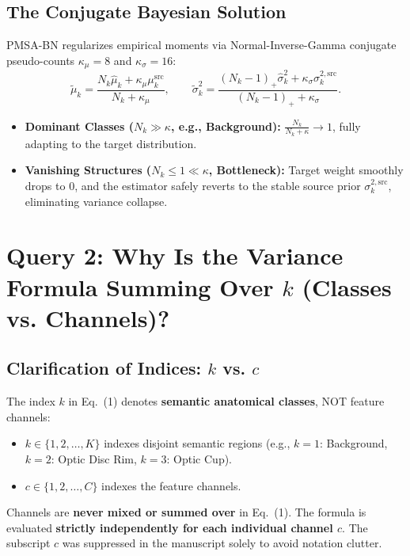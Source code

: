 \documentclass[11pt,a4paper]{article}
\begin{document}
\subsection{The Conjugate Bayesian Solution}
PMSA-BN regularizes empirical moments via Normal-Inverse-Gamma conjugate pseudo-counts $\kappa_\mu = 8$ and $\kappa_\sigma = 16$:
\begin{equation}
    \tilde{\mu}_k = \frac{N_k \hat{\mu}_k + \kappa_\mu \mu_k^{\mathrm{src}}}{N_k + \kappa_\mu}, \qquad 
    \tilde{\sigma}^2_k = \frac{(N_k - 1)_+ \hat{\sigma}^2_k + \kappa_\sigma \sigma_k^{2,\mathrm{src}}}{(N_k - 1)_+ + \kappa_\sigma}.
\end{equation}
\begin{itemize}
    \item \textbf{Dominant Classes ($N_k \gg \kappa$, e.g., Background):} $\frac{N_k}{N_k + \kappa} \to 1$, fully adapting to the target distribution.
    \item \textbf{Vanishing Structures ($N_k \le 1 \ll \kappa$, Bottleneck):} Target weight smoothly drops to $0$, and the estimator safely reverts to the stable source prior $\sigma_k^{2,\mathrm{src}}$, eliminating variance collapse.
\end{itemize}

\vspace{2em}

\section{Query 2: Why Is the Variance Formula Summing Over $k$ (Classes vs. Channels)?}

\subsection{Clarification of Indices: $k$ vs. $c$}
The index $k$ in Eq.~(1) denotes \textbf{semantic anatomical classes}, NOT feature channels:
\begin{itemize}
    \item $k \in \{1, 2, \dots, K\}$ indexes disjoint semantic regions (e.g., $k=1$: Background, $k=2$: Optic Disc Rim, $k=3$: Optic Cup).
    \item $c \in \{1, 2, \dots, C\}$ indexes the feature channels.
\end{itemize}

\begin{tcolorbox}[title=Important Architectural Detail]
Channels are \textbf{never mixed or summed over} in Eq.~(1). The formula is evaluated \textbf{strictly independently for each individual channel $c$}. The subscript $c$ was suppressed in the manuscript solely to avoid notation clutter.
\end{tcolorbox}
\end{document}
